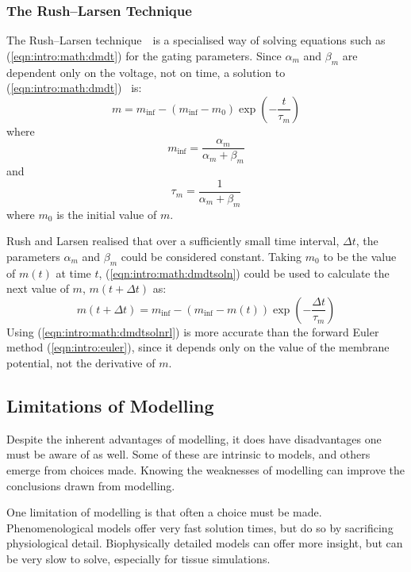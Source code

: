 \subsubsection{The Rush--Larsen Technique}

The Rush--Larsen technique~\cite{RL78}\ is a specialised way of solving
equations such as (\ref{eqn:intro:math:dmdt}) for the gating parameters.
Since $\alpha_m$ and $\beta_m$ are dependent only on the voltage, not on time, a
solution to (\ref{eqn:intro:math:dmdt})~\cite{Hodgkin1952} is:
\begin{equation}
\label{eqn:intro:math:dmdtsoln}
m = m_{\inf} - \left(m_{\inf} - m_0\right)\exp\left(-\frac{t}{\tau_m}\right)
\end{equation}
where
\begin{equation}
\label{eqn:intro:math:infm}
m_{\inf} = \frac{\alpha_{m}}{\alpha_{m} + \beta_{m}}
\end{equation}
and
\begin{equation}
\label{eqn:intro:math:taum}
\tau_m = \frac{1}{\alpha_{m} + \beta_{m}}
\end{equation}
where $m_0$ is the initial value of $m$.

Rush and Larsen realised that over a sufficiently small time interval, $\Delta t$,
the parameters $\alpha_m$ and $\beta_m$ could be considered constant.
Taking $m_0$ to be the value of $m(t)$ at time $t$, (\ref{eqn:intro:math:dmdtsoln})
could be used to calculate the next value of $m$, $m(t + \Delta t)$ as:
\begin{equation}
\label{eqn:intro:math:dmdtsolnrl}
m(t+ \Delta t) = m_{\inf} - \left(m_{\inf} - m(t)\right)\exp\left(-\frac{\Delta t}{\tau_m}\right)
\end{equation}
Using (\ref{eqn:intro:math:dmdtsolnrl}) is more accurate than the forward Euler
method (\ref{eqn:intro:euler}), since it depends only on the value of the
membrane potential, not the derivative of $m$.

\subsection{Limitations of Modelling}

Despite the inherent advantages of modelling, it does have disadvantages one
must be aware of as well.
Some of these are intrinsic to models, and others emerge from choices made.
Knowing the weaknesses of modelling can improve the conclusions drawn from
modelling.

One limitation of modelling is that often a choice must be made.
Phenomenological models offer very fast solution times, but do so by sacrificing
physiological detail.
Biophysically detailed models can offer more insight, but can be very slow to
solve, especially for tissue simulations.

